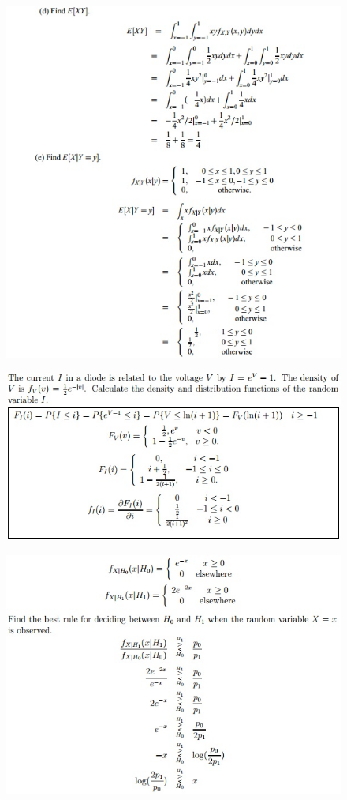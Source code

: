 \documentclass[11pt,landscape]{article}
\begin{document}
\begin{multicols}{3}
\begin{figure}[H]
    \includegraphics[scale=0.58]{./Images/2/joint2.jpg}
\end{figure}
\begin{figure}[H]
    \includegraphics[scale=0.53]{./Images/2/DenDisSolve.jpg}
\end{figure}
\begin{figure}[H]
    \includegraphics[scale=0.53]{./Images/2/Decision.jpg}

\end{figure}
\end{multicols}
\end{document}

